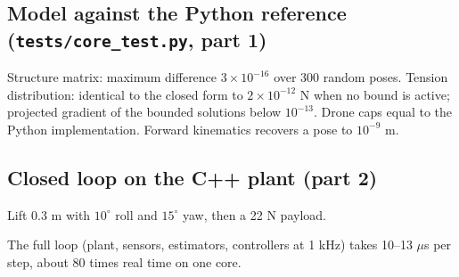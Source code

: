 \subsection{Model against the Python reference (\texttt{tests/core\_test.py}, part 1)}
Structure matrix: maximum difference $3\times10^{-16}$ over 300 random poses. Tension distribution: identical to
the closed form to $2\times10^{-12}$ N when no bound is active; projected gradient of the bounded solutions below
$10^{-13}$. Drone caps equal to the Python implementation. Forward kinematics recovers a pose to $10^{-9}$ m.

\subsection{Closed loop on the C++ plant (part 2)}
Lift 0.3 m with $10^\circ$ roll and $15^\circ$ yaw, then a 22 N payload.
\begin{center}\end{center}
The full loop (plant, sensors, estimators, controllers at 1 kHz) takes 10--13 $\mu$s per step, about 80 times
real time on one core.

